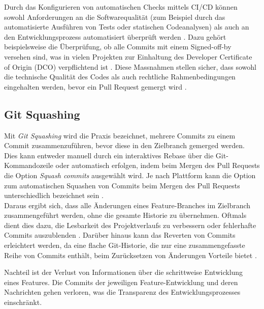 Durch das Konfigurieren von automatischen Checks mittels CI/CD können sowohl Anforderungen an die Softwarequalität (zum Beispiel durch das automatisierte Ausführen von Tests oder statischen Codeanalysen) als auch an den Entwicklungsprozess automatisiert überprüft werden \parencite{kinsman_how_2021}. Dazu gehört beispielsweise die Überprüfung, ob alle Commits mit einem Signed-off-by versehen sind, was in vielen Projekten zur Einhaltung des Developer Certificate of Origin (DCO) verpflichtend ist \parencite{holtgrave_attributing_2025}. Diese Massnahmen stellen sicher, dass sowohl die technische Qualität des Codes als auch rechtliche Rahmenbedingungen eingehalten werden, bevor ein Pull Request gemergt wird \parencite{noauthor_about_nodate}. 

\subsection{Git Squashing}
\label{subsec:GitSquashing}
Mit \textit{Git Squashing} wird die Praxis bezeichnet, mehrere Commits zu einem Commit zusammenzuführen, bevor diese in den Zielbranch gemerged werden. Dies kann entweder manuell durch ein interaktives Rebase über die Git-Kommandozeile oder automatisch erfolgen, indem beim Mergen des Pull Requests die Option \textit{Squash commits} ausgewählt wird. \parencite{noauthor_git_nodate} Je nach Plattform kann die Option zum automatischen Squashen von Commits beim Mergen des Pull Requests unterschiedlich bezeichnet sein \parencite{noauthor_about_nodate} \parencite{noauthor_squash_nodate}. \\
Daraus ergibt sich, dass alle Änderungen eines Feature-Branches im Zielbranch zusammengeführt werden, ohne die gesamte Historie zu übernehmen. Oftmals dient dies dazu, die Lesbarkeit des Projektverlaufs zu verbessern oder fehlerhafte Commits auszublenden \parencite{codoban_comparative_2015}. Darüber hinaus kann das Reverten von Commits erleichtert werden, da eine flache Git-Historie, die nur eine zusammengefasste Reihe von Commits enthält, beim Zurücksetzen von Änderungen Vorteile bietet \parencite{just_switching_2016}.

Nachteil ist der Verlust von Informationen über die schrittweise Entwicklung eines Features. Die Commits der jeweiligen Feature-Entwicklung und deren Nachrichten gehen verloren, was die Transparenz des Entwicklungsprozesses einschränkt.

